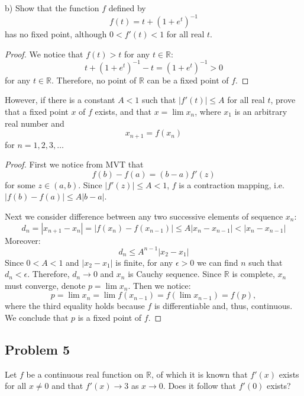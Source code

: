 \documentclass{article}
\newcommand{\R}{\mathbb{R}}
\begin{document}
\begin{tcolorbox}
b) Show that the function $f$ defined by
\[ f(t) = t+(1+e^t)^{-1} \]
has no fixed point, although $0 < f'(t) < 1$ for all real $t$.
\end{tcolorbox}

\begin{proof}

We notice that $f(t) > t$ for any $t \in \R$:
\[  t+(1+e^t)^{-1} - t = (1+e^t)^{-1} > 0 \]
for any $t \in \R$.
Therefore, no point of $\R$ can be a fixed point of $f$.

\end{proof}

\begin{tcolorbox}
However, if there is a constant $A < 1$ such that $|f'(t)| \leq A$ for all real $t$, prove that a fixed point $x$ of $f$ exists, and that $x = \lim x_n$, where $x_1$ is an arbitrary real number and
\[ x_{n+1} = f(x_n) \]
for $n = 1,2,3,\dots$
\end{tcolorbox}

\begin{proof}

First we notice from MVT that
\[ f(b)-f(a) = (b-a) f'(z) \]
for some $z \in (a,b)$. Since $|f'(z)| \leq A < 1$, $f$ is a contraction mapping, i.e. $|f(b)-f(a)| \leq A |b-a|$.

Next we consider difference between any two successive elements of sequence $x_n$:
\[
    d_n = |x_{n+1} - x_{n}| 
    = |f(x_{n}) - f(x_{n-1})| \leq A |x_{n}-x_{n-1}| 
    < |x_{n}-x_{n-1}|
\]
Moreover:
\[ d_n \leq A^{n-1} |x_2 - x_1| \]
Since $0<A<1$ and $|x_2-x_1|$ is finite, for any $\epsilon>0$ we can find $n$ such that $d_n < \epsilon$.
Therefore, $d_n \to 0$ and $x_n$ is Cauchy sequence.
Since $\R$ is complete, $x_n$ must converge, denote $p = \lim x_n$.
Then we notice:
\[ p = \lim x_n = \lim f(x_{n-1}) = f (\lim x_{n-1}) = f(p), \]
where the third equality holds because $f$ is differentiable and, thus, continuous.
We conclude that $p$ is a fixed point of $f$.

\end{proof}


\subsection*{Problem 5}

\begin{tcolorbox}
Let $f$ be a continuous real function on $\R$, of which it is known that $f'(x)$ exists for all $x \neq 0$
and that $f'(x) \to 3$ as $x \to 0$. Does it follow that $f'(0)$ exists?
\end{tcolorbox}
\end{document}

